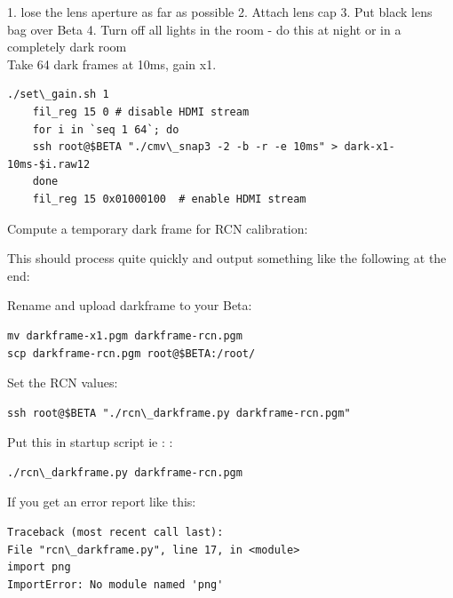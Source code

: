 1. lose the lens aperture as far as possible
2. Attach lens cap
3. Put black lens bag over Beta
4. Turn off all lights in the room - do this at night or in a completely dark room \\
	
Take 64 dark frames at 10ms, gain x1. 
	
\begin{lstlisting}[breaklines=true, breakatwhitespace=true]
	./set\_gain.sh 1
	fil_reg 15 0 # disable HDMI stream
	for i in `seq 1 64`; do
	ssh root@$BETA "./cmv\_snap3 -2 -b -r -e 10ms" > dark-x1-10ms-$i.raw12 
	done 
	fil_reg 15 0x01000100  # enable HDMI stream
\end{lstlisting} 
	
Compute a temporary dark frame for RCN calibration: 
	
	
This should process quite quickly and output something like the following at the end: 
	

Rename and upload darkframe to your Beta:  

\begin{lstlisting}[breaklines=true, breakatwhitespace=true]
mv darkframe-x1.pgm darkframe-rcn.pgm
scp darkframe-rcn.pgm root@$BETA:/root/
\end{lstlisting} 

Set the RCN values: 

\begin{lstlisting}[breaklines=true, breakatwhitespace=true]
ssh root@$BETA "./rcn\_darkframe.py darkframe-rcn.pgm"
\end{lstlisting} 

Put this in startup script ie :  :

\begin{lstlisting}[breaklines=true, breakatwhitespace=true]
./rcn\_darkframe.py darkframe-rcn.pgm 
\end{lstlisting} 

If you get an error report like this: 

\begin{lstlisting}[breaklines=true, breakatwhitespace=true]
Traceback (most recent call last):
File "rcn\_darkframe.py", line 17, in <module>
import png
ImportError: No module named 'png'
\end{lstlisting} 

